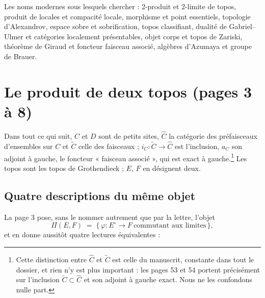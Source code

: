 \documentclass[11pt,a4paper]{article}
\begin{document}
\begin{resume}
Les noms modernes sous lesquels chercher : 2-produit et 2-limite de topos,
produit de locales et compacité locale, morphisme et point essentiels,
topologie d'Alexandrov, espace sobre et sobrification, topos classifiant,
dualité de Gabriel--Ulmer et catégories localement présentables, objet corps et
topos de Zariski, théorème de Giraud et foncteur faisceau associé, algèbres
d'Azumaya et groupe de Brauer.

\end{resume}


\section*{Le produit de deux topos (pages 3 à 8)}

Dans tout ce qui suit, $C$ et $D$ sont de petits sites, $\widehat{C}$ la catégorie
des préfaisceaux d'ensembles sur $C$ et $\widetilde{C}$ celle des faisceaux ;
$i_{C} : \widetilde{C} \to \widehat{C}$ est l'inclusion, $a_{C}$ son adjoint à
gauche, le foncteur « faisceau associé », qui est exact à
gauche.\footnote{Cette distinction entre $\widehat{C}$ et $\widetilde{C}$ est
celle du manuscrit, constante dans tout le dossier, et rien n'y est plus
important : les pages 53 et 54 portent précisément sur l'inclusion
$\widetilde{C} \subset \widehat{C}$ et son adjoint à gauche exact. Nous ne les
confondons nulle part.} Les topos sont les topos de Grothendieck ; $E$, $F$
en désignent deux.

\subsection*{Quatre descriptions du même objet}

La page 3 pose, sans le nommer autrement que par la lettre, l'objet
\[
\Pi(E,F) \;=\; \bigl\{\, \varphi : E^{\circ} \to F \ \text{commutant aux
limites} \,\bigr\},
\]
et en donne aussitôt quatre lectures équivalentes :
\end{document}
